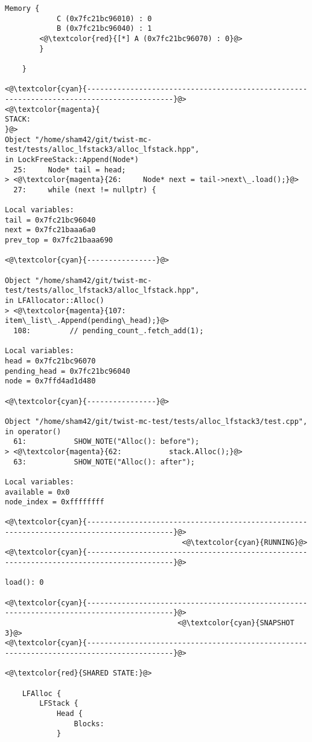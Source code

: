 \begin{adjustwidth}{-3.3cm}{-1cm}
\begin{allintypewriter}
\begin{multicols*}{2}
\begin{lstlisting}[numbers=none]
	    Memory {
		    C (0x7fc21bc96010) : 0
		    B (0x7fc21bc96040) : 1
		<@\textcolor{red}{[*] A (0x7fc21bc96070) : 0}@>
	    }

    }

<@\textcolor{cyan}{------------------------------------------------------------------------------------------}@>
<@\textcolor{magenta}{
STACK:
}@>
Object "/home/sham42/git/twist-mc-test/tests/alloc_lfstack3/alloc_lfstack.hpp",
in LockFreeStack::Append(Node*)
  25:     Node* tail = head;
> <@\textcolor{magenta}{26:     Node* next = tail->next\_.load();}@>
  27:     while (next != nullptr) {

Local variables: 
tail = 0x7fc21bc96040
next = 0x7fc21baaa6a0
prev_top = 0x7fc21baaa690

<@\textcolor{cyan}{----------------}@>

Object "/home/sham42/git/twist-mc-test/tests/alloc_lfstack3/alloc_lfstack.hpp",
in LFAllocator::Alloc()
> <@\textcolor{magenta}{107:         item\_list\_.Append(pending\_head);}@>
  108:         // pending_count_.fetch_add(1);

Local variables: 
head = 0x7fc21bc96070
pending_head = 0x7fc21bc96040
node = 0x7ffd4ad1d480

<@\textcolor{cyan}{----------------}@>

Object "/home/sham42/git/twist-mc-test/tests/alloc_lfstack3/test.cpp",
in operator()
  61:           SHOW_NOTE("Alloc(): before");
> <@\textcolor{magenta}{62:           stack.Alloc();}@>
  63:           SHOW_NOTE("Alloc(): after");

Local variables: 
available = 0x0
node_index = 0xffffffff

<@\textcolor{cyan}{------------------------------------------------------------------------------------------}@>
                                         <@\textcolor{cyan}{RUNNING}@>
<@\textcolor{cyan}{------------------------------------------------------------------------------------------}@>

load(): 0

<@\textcolor{cyan}{------------------------------------------------------------------------------------------}@>
                                        <@\textcolor{cyan}{SNAPSHOT 3}@>
<@\textcolor{cyan}{------------------------------------------------------------------------------------------}@>

<@\textcolor{red}{SHARED STATE:}@>

    LFAlloc {
	    LFStack {
		    Head {
			    Blocks: 
		    }


\end{lstlisting}
\end{multicols*}
\end{allintypewriter}
\end{adjustwidth}
